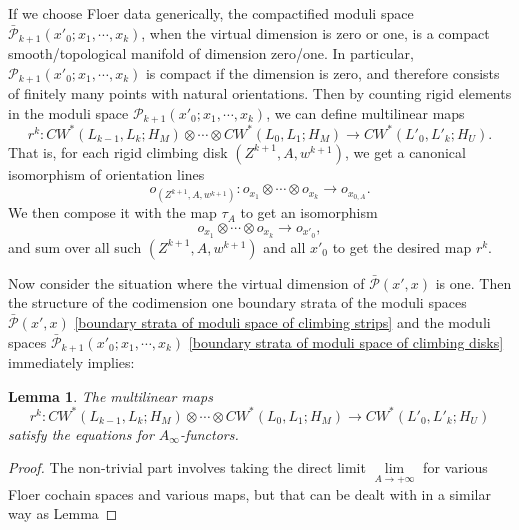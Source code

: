 \documentclass{amsart}
\newtheorem{lemma}[theorem]{Lemma}
\numberwithin{equation}{section}
\numberwithin{figure}{section}
\begin{document}
	If we choose Floer data generically, the compactified moduli space $\bar{\mathcal{P}}_{k+1}(x'_{0}; x_{1}, \cdots, x_{k})$, when the virtual dimension is zero or one, is a compact smooth/topological manifold of dimension zero/one. In particular, $\mathcal{P}_{k+1}(x'_{0}; x_{1}, \cdots, x_{k})$ is compact if the dimension is zero, and therefore consists of finitely many points with natural orientations. Then by counting rigid elements in the moduli space $\mathcal{P}_{k+1}(x'_{0}; x_{1}, \cdots, x_{k})$, we can define multilinear maps
\begin{equation}\label{higher order terms of the Viterbo restriction homomorphism}
r^{k}: CW^{*}(L_{k-1}, L_{k}; H_{M}) \otimes \cdots \otimes CW^{*}(L_{0}, L_{1}; H_{M}) \to CW^{*}(L'_{0}, L'_{k}; H_{U}).
\end{equation}
That is, for each rigid climbing disk $(Z^{k+1}, A, w^{k+1})$, we get a canonical isomorphism of orientation lines
\begin{equation*}
o_{(Z^{k+1}, A, w^{k+1})}: o_{x_{1}} \otimes \cdots \otimes o_{x_{k}} \to o_{x_{0, A}}.
\end{equation*}
We then compose it with the map $\tau_{A}$ to get an isomorphism
\begin{equation*}
o_{x_{1}} \otimes \cdots \otimes o_{x_{k}} \to o_{x'_{0}},
\end{equation*}
and sum over all such $(Z^{k+1}, A, w^{k+1})$ and all $x'_{0}$ to get the desired map $r^{k}$. \par
	Now consider the situation where the virtual dimension of $\bar{\mathcal{P}}(x', x)$ is one. Then the structure of the codimension one boundary strata of the moduli spaces $\bar{\mathcal{P}}(x', x)$ \eqref{boundary strata of moduli space of climbing strips} and the moduli spaces $\bar{\mathcal{P}}_{k+1}(x'_{0}; x_{1}, \cdots, x_{k})$ \eqref{boundary strata of moduli space of climbing disks} immediately implies: \par

\begin{lemma}
	The multilinear maps
\begin{equation*}
r^{k}: CW^{*}(L_{k-1}, L_{k}; H_{M}) \otimes \cdots \otimes CW^{*}(L_{0}, L_{1}; H_{M}) \to CW^{*}(L'_{0}, L'_{k}; H_{U})
\end{equation*}
satisfy the equations for $A_{\infty}$-functors.
\end{lemma}
\begin{proof}
	The non-trivial part involves taking the direct limit $\lim\limits_{A \to +\infty}$ for various Floer cochain spaces and various maps, but that can be dealt with in a similar way as Lemma
\end{proof}
\end{document}
